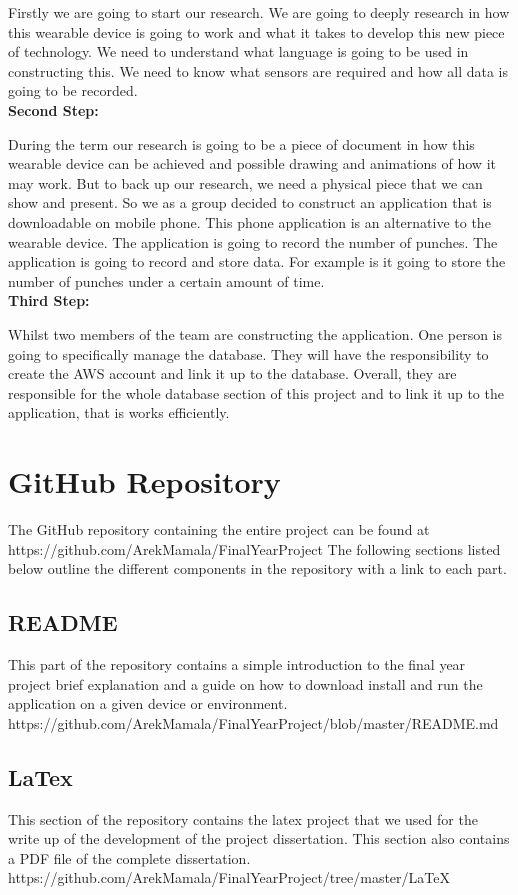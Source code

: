 \documentclass[a4paper,12pt]{report}
\begin{document}
Firstly we are going to start our research. We are going to deeply research in how this wearable device is going to work and what it takes to develop this new piece of technology. We need to understand what language is going to be used in constructing this. We need to know what sensors are required and how all data is going to be recorded.
\\
\textbf{Second Step:}

During the term our research is going to be a piece of document in how this wearable device can be achieved and possible drawing and animations of how it may work. But to back up our research, we need a physical piece that we can show and present. So we as a group decided to construct an application that is downloadable on mobile phone. This phone application is an alternative to the wearable device. The application is going to record the number of punches. The application is going to record and store data. For example is it going to store the number of punches under a certain amount of time.
\\
\textbf{Third Step:}

Whilst two members of the team are constructing the application. One person is going to specifically manage the database. They will have the responsibility to create the AWS account and link it up to the database. Overall, they are responsible for the whole database section of this project and to link it up to the application, that is works efficiently.

\section{GitHub Repository}
The GitHub repository containing the entire project can be found at 
https://github.com/ArekMamala/FinalYearProject
The following sections listed below outline the different components in the repository with a link to each part.
\subsection{README}
This part of the repository contains a simple introduction to the final year project brief explanation and a guide on how to download  install and run the application on a given device or environment.
https://github.com/ArekMamala/FinalYearProject/blob/master/README.md
\subsection{LaTex}
This section of the repository contains the latex project that we used for the write up of the development of the project dissertation. This section also contains a PDF file of the complete dissertation.  
https://github.com/ArekMamala/FinalYearProject/tree/master/LaTeX
\end{document}

